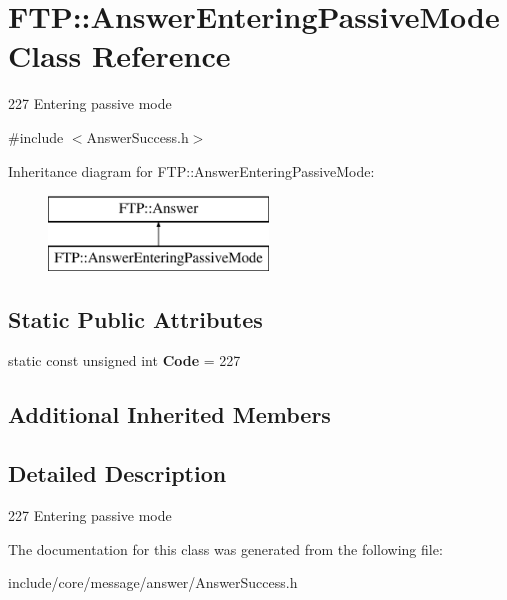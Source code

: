 \hypertarget{class_f_t_p_1_1_answer_entering_passive_mode}{\section{F\-T\-P\-:\-:Answer\-Entering\-Passive\-Mode Class Reference}
\label{class_f_t_p_1_1_answer_entering_passive_mode}
}


227 Entering passive mode  




{\ttfamily \#include $<$Answer\-Success.\-h$>$}

Inheritance diagram for F\-T\-P\-:\-:Answer\-Entering\-Passive\-Mode\-:\begin{figure}[H]
\begin{center}
\leavevmode
\includegraphics[height=2.000000cm]{class_f_t_p_1_1_answer_entering_passive_mode}
\end{center}
\end{figure}
\subsection*{Static Public Attributes}
\begin{DoxyCompactItemize}
\item 
\hypertarget{class_f_t_p_1_1_answer_entering_passive_mode_a3f6261b4cfda714e0611d9184e698c6d}{static const unsigned int {\bfseries Code} = 227}\label{class_f_t_p_1_1_answer_entering_passive_mode_a3f6261b4cfda714e0611d9184e698c6d}

\end{DoxyCompactItemize}
\subsection*{Additional Inherited Members}


\subsection{Detailed Description}
227 Entering passive mode 

The documentation for this class was generated from the following file\-:\begin{DoxyCompactItemize}
\item 
include/core/message/answer/Answer\-Success.\-h\end{DoxyCompactItemize}
